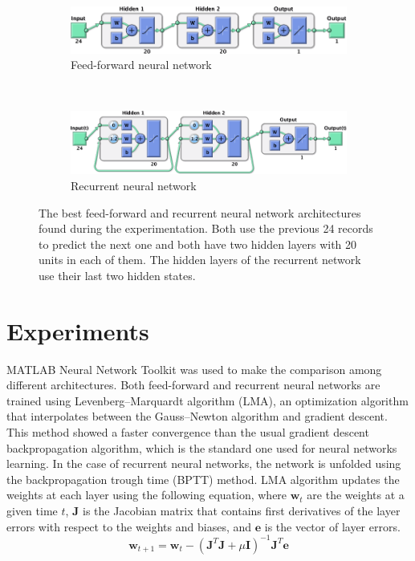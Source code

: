 \documentclass[10pt,a4paper]{article}
\begin{document}
\begin{figure}[h]
\centering
\begin{subfigure}[b]{0.7\textwidth}
\centering
\includegraphics[width=\textwidth]{ffnn_win.png}
\caption{Feed-forward neural network}
\label{fig:ffnn}
\end{subfigure}
\\
\begin{subfigure}[b]{0.7\textwidth}
\centering
\includegraphics[width=\textwidth]{rnn_win.png}
\caption{Recurrent neural network}
\label{fig:rnn}
\end{subfigure}
\caption{The best feed-forward and recurrent neural network architectures found during the experimentation. Both use the previous 24 records to predict the next one and both have two hidden layers with 20 units in each of them. The hidden layers of the recurrent network use their last two hidden states.}
\end{figure}

\section{Experiments}
MATLAB Neural Network Toolkit was used to make the comparison among different architectures. Both feed-forward and recurrent neural networks are trained using Levenberg--Marquardt algorithm (LMA)\cite{more1978levenberg,hagan1994training}, an optimization algorithm that interpolates between the Gauss--Newton algorithm and gradient descent. This method showed a faster convergence than the usual gradient descent backpropagation algorithm, which is the standard one used for neural networks learning. In the case of recurrent neural networks, the network is unfolded using the backpropagation trough time (BPTT) method\cite{mozer1995focused,werbos1990backpropagation}. LMA algorithm updates the weights at each layer using the following equation, where $\mathbf{w}_t$ are the weights at a given time $t$, $\mathbf{J}$ is the Jacobian matrix that contains first derivatives of the layer errors with respect to the weights and biases, and $\mathbf{e}$ is the vector of layer errors. 
\begin{equation}
\mathbf{w}_{t+1} = \mathbf{w}_t - \left( \mathbf{J}^T \mathbf{J} + \mu \mathbf{I} \right)^{-1} \mathbf{J}^T \mathbf{e}
\end{equation}
\end{document}
